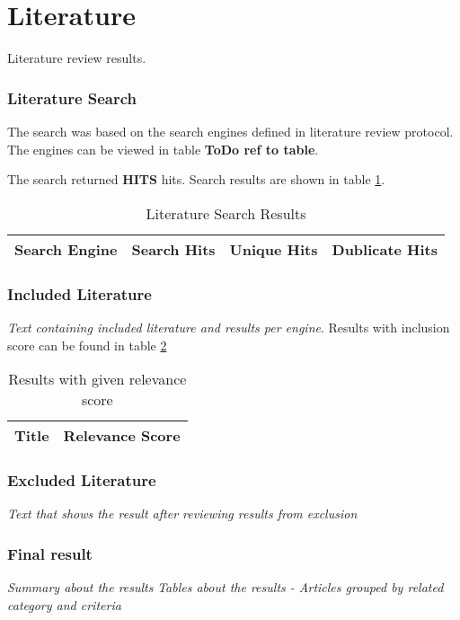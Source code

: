 \section{Literature}
Literature review results.

\subsubsection{Literature Search}
The search was based on the search engines defined in literature review protocol.
The engines can be viewed in table \textbf{ToDo ref to table}.

The search returned \textbf{HITS} hits.
Search results are shown in table \ref{table:literature:searchResults}.

\begin{table}[h!]
    \begin{tabular}{|c|c|c|c|} 
        \hline
        Search Engine
        & Search Hits
        & Unique Hits
        & Dublicate Hits
        \\ 
        \hline
    \end{tabular}    
    \caption{Literature Search Results}
    \label{table:literature:searchResults}
\end{table}

\subsubsection{Included Literature}
\textit{Text containing included literature and results per engine}.
Results with inclusion score can be found in table \ref{table:literature:inclusionResults}

\begin{table}[h!]
    \begin{tabular}{| c | c |}
        \hline
        Title
        & Relevance Score
        \\
        \hline
    \end{tabular}
    \caption{Results with given relevance score}
    \label{table:literature:inclusionResults}
\end{table}

\subsubsection{Excluded Literature}
\textit{Text that shows the result after reviewing results from exclusion}


\subsubsection{Final result}
\textit{Summary about the results}
\textit{Tables about the results - Articles grouped by related category and criteria}